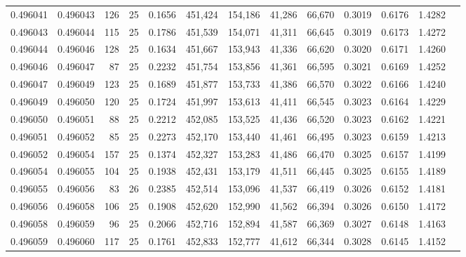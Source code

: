 \begin{tabular}{rrrrrrrrrrrrr}
0.496041 & 0.496043 &   126 &  25 &                                     0.1656 & 451,424 & 154,186 &  41,286 &  66,670 & 0.3019 & 0.6176 & 1.4282 \\
0.496043 & 0.496044 &   115 &  25 &                                     0.1786 & 451,539 & 154,071 &  41,311 &  66,645 & 0.3019 & 0.6173 & 1.4272 \\
0.496044 & 0.496046 &   128 &  25 &                                     0.1634 & 451,667 & 153,943 &  41,336 &  66,620 & 0.3020 & 0.6171 & 1.4260 \\
0.496046 & 0.496047 &    87 &  25 &                                     0.2232 & 451,754 & 153,856 &  41,361 &  66,595 & 0.3021 & 0.6169 & 1.4252 \\
0.496047 & 0.496049 &   123 &  25 &                                     0.1689 & 451,877 & 153,733 &  41,386 &  66,570 & 0.3022 & 0.6166 & 1.4240 \\
0.496049 & 0.496050 &   120 &  25 &                                     0.1724 & 451,997 & 153,613 &  41,411 &  66,545 & 0.3023 & 0.6164 & 1.4229 \\
0.496050 & 0.496051 &    88 &  25 &                                     0.2212 & 452,085 & 153,525 &  41,436 &  66,520 & 0.3023 & 0.6162 & 1.4221 \\
0.496051 & 0.496052 &    85 &  25 &                                     0.2273 & 452,170 & 153,440 &  41,461 &  66,495 & 0.3023 & 0.6159 & 1.4213 \\
0.496052 & 0.496054 &   157 &  25 &                                     0.1374 & 452,327 & 153,283 &  41,486 &  66,470 & 0.3025 & 0.6157 & 1.4199 \\
0.496054 & 0.496055 &   104 &  25 &                                     0.1938 & 452,431 & 153,179 &  41,511 &  66,445 & 0.3025 & 0.6155 & 1.4189 \\
0.496055 & 0.496056 &    83 &  26 &                                     0.2385 & 452,514 & 153,096 &  41,537 &  66,419 & 0.3026 & 0.6152 & 1.4181 \\
0.496056 & 0.496058 &   106 &  25 &                                     0.1908 & 452,620 & 152,990 &  41,562 &  66,394 & 0.3026 & 0.6150 & 1.4172 \\
0.496058 & 0.496059 &    96 &  25 &                                     0.2066 & 452,716 & 152,894 &  41,587 &  66,369 & 0.3027 & 0.6148 & 1.4163 \\
0.496059 & 0.496060 &   117 &  25 &                                     0.1761 & 452,833 & 152,777 &  41,612 &  66,344 & 0.3028 & 0.6145 & 1.4152 \\

\end{tabular}
